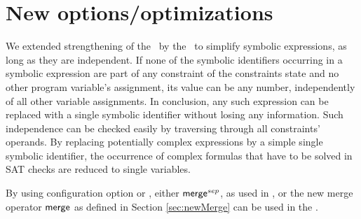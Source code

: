 \section{New options/optimizations}
\label{sec:newOptions}

We extended strengthening of the \ by the \constraintsCPA\ to simplify symbolic expressions, as long as they are independent.
If none of the symbolic identifiers occurring in a symbolic expression are part of any constraint of the constraints state and no other program variable's assignment,
its value can be any number, independently of all other variable assignments.
In conclusion, any such expression can be replaced with a single symbolic identifier without losing any information.
Such independence can be checked easily by traversing through all constraints' operands.
By replacing potentially complex expressions by a simple single symbolic identifier, the occurrence of complex formulas that have to be solved in SAT checks are reduced to single variables.
 
By using configuration option  or , either $\operatorname{\operatorname{\mathsf{merge}}}^{sep}$, as used in \cite{Lemberger2015}, or the new merge operator $\operatorname{\operatorname{\mathsf{merge}}}$ as defined in Section \ref{sec:newMerge} can be used in the \constraintsCPA.

